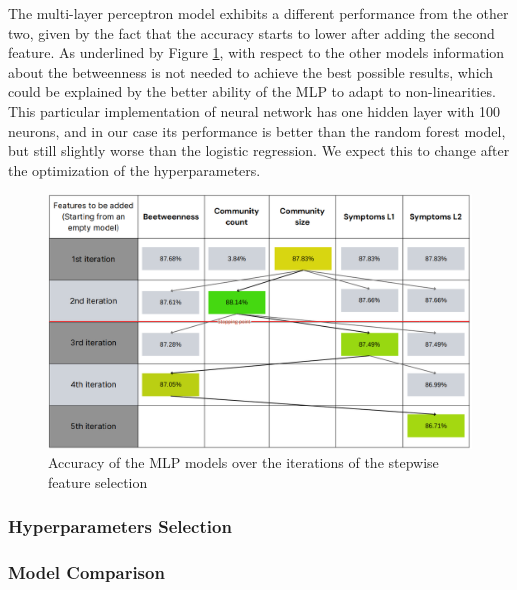 The multi-layer perceptron model exhibits a different performance from the other two, given by the fact that the accuracy starts to lower after adding the second feature. As underlined by Figure \ref{fig:stepwise_acc_mlp}, with respect to the other models information about the betweenness is not needed to achieve the best possible results, which could be explained by the better ability of the MLP to adapt to non-linearities. This particular implementation of neural network has one hidden layer with 100 neurons, and in our case its performance is better than the random forest model, but still slightly worse than the logistic regression. We expect this to change after the optimization of the hyperparameters. 

\begin{figure}[H]
	\centering
	\includegraphics[width=\columnwidth]{images/stepwise_acc_mlp.png}
	\caption{Accuracy of the MLP models over the iterations of the stepwise feature selection}
	\label{fig:stepwise_acc_mlp}
\end{figure}


\subsubsection*{Hyperparameters Selection}


\subsubsection*{Model Comparison} \label{subsubsec:results_ML_model_comparison}

